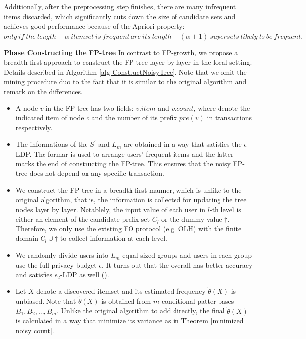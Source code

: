\documentclass[conference]{IEEEtran}
\begin{document}
Additionally, after the preprocessing step finishes, there are many infrequent items discarded, which significantly cuts down the size of candidate sets and achieves good performance because of the Apriori property\cite{apr}:{\color{red} $only\ if\ the\ length-\alpha\ itemset\ is\ frequent\ are\ its\ length-(\alpha +1)\ supersets\ likely\ to\ be\ frequent.$}

\textbf{Phase \uppercase\expandafter{} Constructing the FP-tree} In contrast to FP-growth, we propose a breadth-first approach to construct the FP-tree layer by layer in the local setting. Details described in Algorithm \ref{alg ConstructNoisyTree}. Note that we omit the mining procedure duo to the fact that it is similar to the original algorithm and remark on the differences.

\begin{itemize}
\item A node $v$ in the FP-tree has two fields: $v.item$ and $v.count$, where denote the indicated item of node $v$ and the number of its prefix $pre(v)$ in transactions respectively.
\item The informations of the $S^{\prime}$ and $L_m$ are obtained in a way that satisfies the $\epsilon$-LDP. The formar is used to arrange users' frequent items and the latter marks the end of constructing the FP-tree. This ensures that the noisy FP-tree does not depend on any specific transaction.
\item We construct the FP-tree in a breadth-first manner, which is unlike to the original algorithm, that is, the information is collected for updating the tree nodes layer by layer. Notablely, the input value of each user in $l$-th level is either an element of the candidate prefix set $C_l$ or the dummy value $\dagger$. Therefore, we only use the existing FO protocol (e.g. OLH) with the finite domain $C_l \cup \dagger$ to collect information at each level.
\item We randomly divide users into $L_m$ equal-sized groups and users in each group use the full privacy budget $\epsilon$. It turns out that the overall has better accuracy and satisfies $\epsilon_2$-LDP as well (\cite{a8,privtrie}).
\item {\color{red} Let $X$ denote a discovered itemset and its estimated frequency $\tilde {\theta}(X)$ is unbiased. Note that $\tilde {\theta}(X)$ is obtained from $m$ conditional patter bases $B_1,B_2,...,B_m$. Unlike the original algorithm to add directly, the final $\tilde {\theta}(X)$ is calculated in a way that minimize its variance as in Theorem \ref{minimized noisy count}. 


}
\end{itemize}
\end{document}
